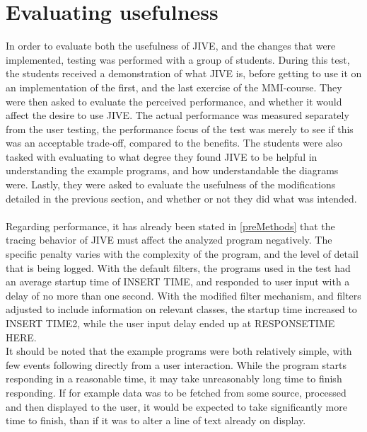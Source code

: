 \section{Evaluating usefulness}\label{jiveEval}
In order to evaluate both the usefulness of JIVE, and the changes that were implemented, testing was performed with a group of students.
During this test, the students received a demonstration of what JIVE is, before getting to use it on an implementation of the first, and the last exercise of the MMI-course.
They were then asked to evaluate the perceived performance, and whether it would affect the desire to use JIVE.
The actual performance was measured separately from the user testing, the performance focus of the test was merely to see if this was an acceptable trade-off, compared to the benefits.
The  students were also tasked with evaluating to what degree they found JIVE to be helpful in understanding the example programs, and how understandable the diagrams were.
Lastly, they were asked to evaluate the usefulness of the modifications detailed in the previous section, and whether or not they did what was intended.
~\\

Regarding performance, it has already been stated in \autoref{preMethods} that the tracing behavior of JIVE must affect the analyzed program negatively.
The specific penalty varies with the complexity of the program, and the level of detail that is being logged.
With the default filters, the programs used in the test had an average startup time of INSERT TIME, and responded to user input with a delay of no more than one second.
With the modified filter mechanism, and filters adjusted to include information on relevant classes, the startup time increased to INSERT TIME2, while the user input delay ended up at RESPONSETIME HERE.
~\\

It should be noted that the example programs were both relatively simple, with few events following directly from a user interaction.
While the program starts responding in a reasonable time, it may take unreasonably long time to finish responding.
If for example data was to be fetched from some source, processed and then displayed to the user, it would be expected to take significantly more time to finish, than if it was to alter a line of text already on display.
~\\
